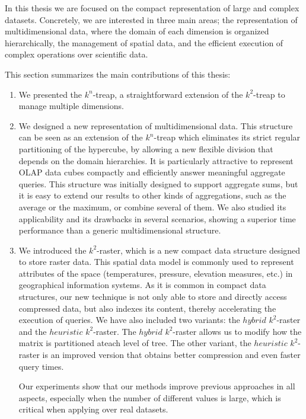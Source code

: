 	In this thesis we are focused on the compact representation of large and complex datasets. Concretely, we are interested in three main areas;  the representation of multidimensional data, where the domain of each dimension is organized hierarchically, the management of spatial data, and the efficient execution of complex operations over scientific data.
	
	This section summarizes the main contributions of this thesis:
	\begin{enumerate}
		\item We presented the $k^n$-treap, a straightforward extension of the $k^2$-treap to manage multiple dimensions. 
		\item We designed a new representation of multidimensional data. This structure can be seen as an extension of the $k^n$-treap which eliminates its strict regular partitioning of the hypercube, by allowing a new flexible division that depends on the domain hierarchies. It is particularly attractive to represent OLAP data cubes compactly and efficiently answer meaningful aggregate queries. This structure was initially designed to support aggregate sums, but it is easy to extend our results to other kinds of aggregations, such as the average  or the maximum, or combine several of them. We also studied its applicability and its drawbacks in  several scenarios, showing a			
		superior time performance than a generic multidimensional structure.	

		\item We introduced the $k^2$-raster, which is a new compact data structure designed to store raster data. This spatial data model is commonly used to represent attributes of the space (temperatures, pressure, elevation measures, etc.) in geographical information systems. As it is common in compact data structures, our new technique is not only able to store and directly access compressed data, but also indexes its content, thereby accelerating the execution of queries. We have also included two variants: the $hybrid$ $k^2$-raster and the $heuristic$ $k^2$-raster. The $hybrid$ $k^2$-raster  allows us to modify how the matrix is partitioned ateach level of tree. The other variant, the $heuristic$ $k^2$-raster   is an improved version  that obtains better compression and even faster query times. 
		
		Our experiments show that our methods improve previous approaches in all aspects, especially when the number of different values is large, which is critical when applying over real datasets.


\end{enumerate}
